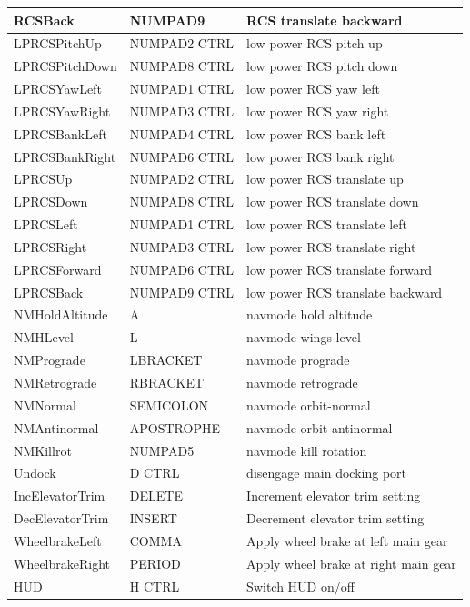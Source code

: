 \documentclass[Orbiter User Manual.tex]{subfiles}
\begin{document}
\begin{longtable}{ p{} p{} p{} }
	\hline
	RCSBack & NUMPAD9 & RCS translate backward\\
	\hline
	LPRCSPitchUp & NUMPAD2 CTRL & low power RCS pitch up\\
	\hline
	LPRCSPitchDown & NUMPAD8 CTRL & low power RCS pitch down\\
	\hline
	LPRCSYawLeft & NUMPAD1 CTRL & low power RCS yaw left\\
	\hline
	LPRCSYawRight & NUMPAD3 CTRL & low power RCS yaw right\\
	\hline
	LPRCSBankLeft & NUMPAD4 CTRL & low power RCS bank left\\
	\hline
	LPRCSBankRight & NUMPAD6 CTRL & low power RCS bank right\\
	\hline
	LPRCSUp & NUMPAD2 CTRL & low power RCS translate up\\
	\hline
	LPRCSDown & NUMPAD8 CTRL & low power RCS translate down\\
	\hline
	LPRCSLeft & NUMPAD1 CTRL & low power RCS translate left\\
	\hline
	LPRCSRight & NUMPAD3 CTRL & low power RCS translate right\\
	\hline
	LPRCSForward & NUMPAD6 CTRL & low power RCS translate forward\\
	\hline
	LPRCSBack & NUMPAD9 CTRL & low power RCS translate backward\\
	\hline
	NMHoldAltitude & A & navmode hold altitude\\
	\hline
	NMHLevel & L & navmode wings level\\
	\hline
	NMPrograde & LBRACKET & navmode prograde\\
	\hline
	NMRetrograde & RBRACKET & navmode retrograde\\
	\hline
	NMNormal & SEMICOLON & navmode orbit-normal\\
	\hline
	NMAntinormal & APOSTROPHE & navmode orbit-antinormal\\
	\hline
	NMKillrot & NUMPAD5 & navmode kill rotation\\
	\hline
	Undock & D CTRL & disengage main docking port\\
	\hline
	IncElevatorTrim & DELETE & Increment elevator trim setting\\
	\hline
	DecElevatorTrim & INSERT & Decrement elevator trim setting\\
	\hline
	WheelbrakeLeft & COMMA & Apply wheel brake at left main gear\\
	\hline
	WheelbrakeRight & PERIOD & Apply wheel brake at right main gear\\
	\hline
	HUD & H CTRL & Switch HUD on/off\\

\end{longtable}
\end{document}
